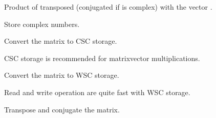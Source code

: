 \documentclass[a4paper,11pt,english]{sphinxmanual}
\begin{document}
\begin{fulllineitems}
\begin{fulllineitems}
\end{fulllineitems}


\begin{fulllineitems}
\label{\detokenize{python/cmdref_Spmat:getfem.Spmat.tmult}}
Product of  transposed (conjugated if  is complex) with the
vector .

\end{fulllineitems}


\begin{fulllineitems}
\label{\detokenize{python/cmdref_Spmat:getfem.Spmat.to_complex}}
Store complex numbers.

\end{fulllineitems}


\begin{fulllineitems}
\label{\detokenize{python/cmdref_Spmat:getfem.Spmat.to_csc}}
Convert the matrix to CSC storage.

CSC storage is recommended for matrix\sphinxhyphen{}vector multiplications.

\end{fulllineitems}


\begin{fulllineitems}
\label{\detokenize{python/cmdref_Spmat:getfem.Spmat.to_wsc}}
Convert the matrix to WSC storage.

Read and write operation are quite fast with WSC storage.

\end{fulllineitems}


\begin{fulllineitems}
\label{\detokenize{python/cmdref_Spmat:getfem.Spmat.transconj}}
Transpose and conjugate the matrix.


\end{fulllineitems}
\end{fulllineitems}
\end{document}
